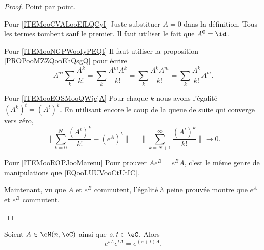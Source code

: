 \begin{proof}
    Point par point.
    \begin{subproof}
        \item[Pour \ref{ITEMooCVALooEfLQCyI}]
            Juste substituer \( A=0\) dans la définition. Tous les termes tombent sauf le premier. Il faut utiliser le fait que \( A^0=\id\).
        \item[Pour \ref{ITEMooNGPWooIyPEQt}]
            Il faut utiliser la proposition \ref{PROPooMZZQooEhQsgQ} pour écrire
            \begin{equation}        \label{EQooLUUVooCtUtIC}
                A^m\sum_k\frac{ A^k }{ k! }=\sum_k\frac{ A^mA^k }{ k! }=\sum_{k}\frac{ A^kA^m }{ k! }=\sum_k\frac{ A^k }{ k! }A^m.
            \end{equation}
        \item[Pour \ref{ITEMooEOSMooQWjcjA}]
            Pour chaque \( k\) nous avons l'égalité \( (A^k)^t=(A^t)^k\). En utilisant encore le coup de la queue de suite qui converge vers zéro,
            \begin{equation}
                \| \sum_{k=0}^N\frac{ (A^t)^k }{ k! }-( e^{A})^t \|=\| \sum_{k=N+1}^{\infty}\frac{ (A^t)^k }{ k! } \|\to 0.
            \end{equation}
        \item[Pour \ref{ITEMooROPJooMarenu}]
            Pour prouver \( A e^{B}= e^{B}A\), c'est le même genre de manipulations que \eqref{EQooLUUVooCtUtIC}.

            Maintenant, vu que \( A\) et \( e^B\) commutent, l'égalité à peine prouvée montre que \(  e^{A}\) et \(  e^{B}\) commutent.
    \end{subproof}
\end{proof}

\begin{proposition}       \label{PROPooKDKDooCUpGzE}
    Soient \( A\in \eM(n,\eC)\) ainsi que \( s,t\in \eC\). Alors
    \begin{equation}
         e^{sA} e^{tA} = e^{(s+t)A}.
    \end{equation}
\end{proposition}

